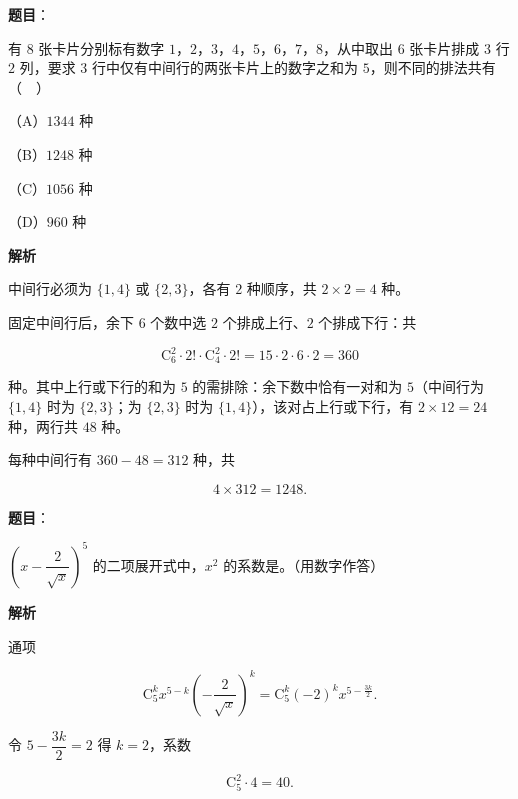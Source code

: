 \begin{answer}

\textbf{题目}：

有 $8$ 张卡片分别标有数字 $1$，$2$，$3$，$4$，$5$，$6$，$7$，$8$，从中取出 $6$ 张卡片排成 $3$ 行 $2$ 列，要求 $3$ 行中仅有中间行的两张卡片上的数字之和为 $5$，则不同的排法共有（　）

（A）$1344$ 种

（B）$1248$ 种

（C）$1056$ 种

（D）$960$ 种

\textbf{解析}

中间行必须为 $\{1,4\}$ 或 $\{2,3\}$，各有 $2$ 种顺序，共 $2\times2=4$ 种。

固定中间行后，余下 $6$ 个数中选 $2$ 个排成上行、$2$ 个排成下行：共

\nopagebreak[4]
\[\mathrm C_6^2\cdot2!\cdot\mathrm C_4^2\cdot2!=15\cdot2\cdot6\cdot2=360\]

种。其中上行或下行的和为 $5$ 的需排除：余下数中恰有一对和为 $5$（中间行为 $\{1,4\}$ 时为 $\{2,3\}$；为 $\{2,3\}$ 时为 $\{1,4\}$），该对占上行或下行，有 $2\times12=24$ 种，两行共 $48$ 种。

每种中间行有 $360-48=312$ 种，共

\nopagebreak[4]
\[4\times312=1248.\]


\end{answer}
\begin{answer}

\textbf{题目}：

$\left(x-\dfrac2{\sqrt x}\right)^5$ 的二项展开式中，$x^2$ 的系数是\gkblank{}。（用数字作答）

\textbf{解析}

通项

\nopagebreak[4]
\[\mathrm C_5^kx^{5-k}\left(-\frac2{\sqrt x}\right)^k=\mathrm C_5^k(-2)^kx^{5-\frac{3k}2}.\]

令 $5-\dfrac{3k}2=2$ 得 $k=2$，系数

\nopagebreak[4]
\[\mathrm C_5^2\cdot4=40.\]


\end{answer}
